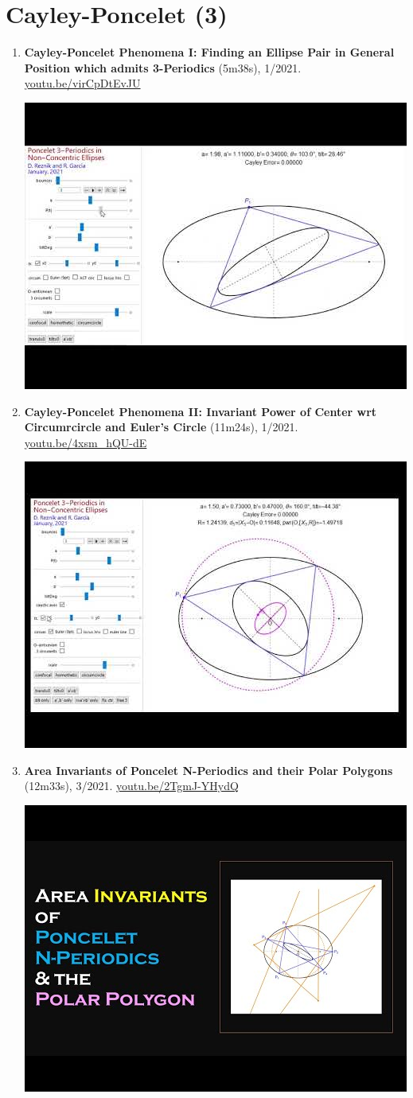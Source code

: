 \documentclass[12pt]{article}
\begin{document}
\section{Cayley-Poncelet (3)}

\begin{enumerate}[resume]
\item \textbf{Cayley-Poncelet Phenomena I: Finding an Ellipse Pair in General Position which admits 3-Periodics} (5m38s), 1/2021. \href{https://youtu.be/virCpDtEvJU}{\url{youtu.be/virCpDtEvJU}}
\begin{center}\includegraphics[width=.5\textwidth]{pics/virCpDtEvJU.jpg}\end{center}
% 
\item \textbf{Cayley-Poncelet Phenomena II: Invariant Power of Center wrt Circumrcircle and Euler's Circle} (11m24s), 1/2021. \href{https://youtu.be/4xsm_hQU-dE}{\url{youtu.be/4xsm\_hQU-dE}}
\begin{center}\includegraphics[width=.5\textwidth]{pics/4xsm_hQU-dE.jpg}\end{center}
% 
\item \textbf{Area Invariants of Poncelet N-Periodics and their Polar Polygons} (12m33s), 3/2021. \href{https://youtu.be/2TgmJ-YHydQ}{\url{youtu.be/2TgmJ-YHydQ}}
\begin{center}\includegraphics[width=.5\textwidth]{pics/2TgmJ-YHydQ.jpg}\end{center}
% 
\end{enumerate}
\end{document}
